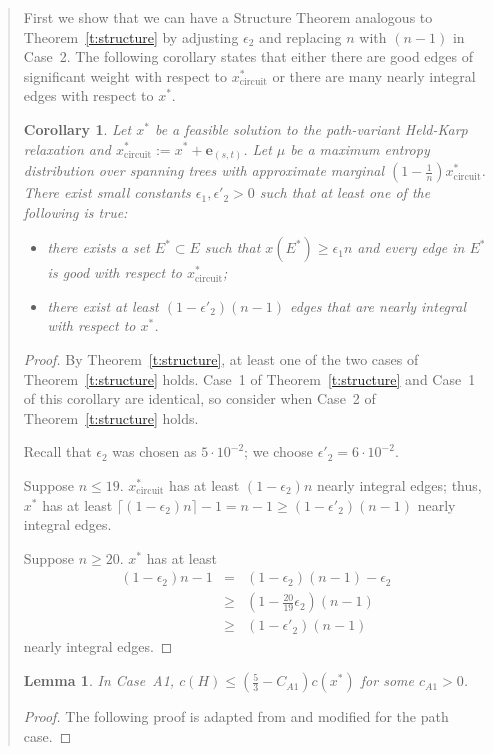 \documentclass[11pt,letterpaper]{article}
\newtheorem{lemma}{Lemma}
\newtheorem{cor}{Corollary}
\begin{document}
\begin{quote}
First we show that we can have a Structure Theorem analogous to Theorem~\ref{t:structure} by adjusting $\epsilon_2$ and replacing $n$ with $(n-1)$ in Case~2. The following corollary states that either there are good edges of significant weight with respect to $x^*_{\mathrm{circuit}}$ or there are many nearly integral edges with respect to $x^*$.
\begin{cor}
\label{c:pathstructure}
Let $x^*$ be a feasible solution to the path-variant Held-Karp relaxation and  $x^*_{\mathrm{circuit}} := x^*+\mathbf{\mathbf{e}}_{(s,t)}$. Let $\mu$ be a maximum entropy distribution over spanning trees with approximate marginal $(1-\frac{1}{n}) x^*_{\mathrm{circuit}}$. There exist small constants $\epsilon_1 , \epsilon'_2 >0$ such that at least one of the following is true:\begin{itemize}
\item[1.] there exists a set $E^*\subset E$ such that $x(E^*)\geq \epsilon_1 n$ and every edge in $E^*$ is good with respect to $x^*_{\mathrm{circuit}}$;
\item[2.] there exist at least $(1-\epsilon'_2)(n-1)$ edges that are nearly integral with respect to $x^*$.
\end{itemize}
\end{cor}
\begin{proof}
By Theorem~\ref{t:structure}, at least one of the two cases of Theorem~\ref{t:structure} holds. Case~1 of Theorem~\ref{t:structure} and Case~1 of this corollary are identical, so consider when Case~2 of Theorem~\ref{t:structure} holds.

Recall that $\epsilon_2$ was chosen as $5\cdot 10^{-2}$; we choose $\epsilon'_2=6\cdot 10^{-2}$.

Suppose $n\leq 19$. $x^*_{\mathrm{circuit}}$ has at least $(1-\epsilon_2)n$ nearly integral edges; thus, $x^*$ has at least $\lceil (1-\epsilon_2)n\rceil - 1 = n-1\geq (1-\epsilon'_2)(n-1)$ nearly integral edges.

Suppose $n\geq 20$. $x^*$ has at least\begin{eqnarray*}
(1-\epsilon_2)n-1&=&(1-\epsilon_2)(n-1)-\epsilon_2\\
&\geq& (1-\frac{20}{19}\epsilon_2)(n-1)\\
&\geq& (1-\epsilon'_2)(n-1)
\end{eqnarray*}nearly integral edges.
\end{proof}

\begin{lemma}
\label{l:fca1}
In Case~A1, $c(H)\leq (\frac{5}{3}-C_{A1})c(x^*)$ for some $c_{A1}>0$.
\end{lemma}
\begin{proof}
The following proof is adapted from \cite{OSS} and modified for the path case.


\end{proof}
\end{quote}
\end{document}
